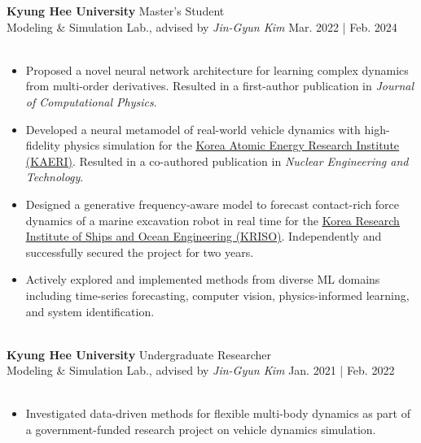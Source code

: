 \documentclass[a4paper,10pt]{extarticle}
\begin{document}
\noindent\textbf{Kyung Hee University} \hfill Master's Student\\
Modeling \& Simulation Lab., advised by \textsl{Jin-Gyun Kim} \hfill Mar. 2022 | Feb. 2024\\
\vspace*{-0.25cm}\\
\begin{minipage}{0.77\textwidth}
	\footnotesize
	\begin{itemize}
		\item Proposed a novel neural network architecture for learning complex dynamics from multi-order derivatives. Resulted in a first-author publication in \textit{Journal of Computational Physics}.
		\item Developed a neural metamodel of real-world vehicle dynamics with high-fidelity physics simulation for the \href{https://www.kaeri.re.kr/eng/}{\ul{Korea Atomic Energy Research Institute (KAERI)}}. Resulted in a co-authored publication in \textit{Nuclear Engineering and Technology}.
		\item Designed a generative frequency-aware model to forecast contact-rich force dynamics of a marine excavation robot in real time for the \href{https://www.kriso.re.kr/eng/}{\ul{Korea Research Institute of Ships and Ocean Engineering (KRISO)}}. Independently and successfully secured the project for two years.
		\item Actively explored and implemented methods from diverse ML domains including time-series forecasting, computer vision, physics-informed learning, and system identification.
	\end{itemize}
\end{minipage}\\

\vspace*{0.1cm}
\noindent\textbf{Kyung Hee University} \hfill Undergraduate Researcher\\
Modeling \& Simulation Lab., advised by \textsl{Jin-Gyun Kim} \hfill Jan. 2021 | Feb. 2022\\
\vspace*{-0.25cm}\\
\begin{minipage}{0.77\textwidth}
	\footnotesize
	\begin{itemize}
		\item Investigated data-driven methods for flexible multi-body dynamics as part of a government-funded research project on vehicle dynamics simulation.
	\end{itemize}
\end{minipage}\\
\vspace*{-0.2cm}
\end{document}
